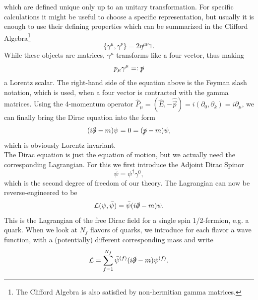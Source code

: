 which are defined unique only up to an unitary transformation. For specific calculations it might be useful to choose a specific representation, but usually it is enough to use their defining properties which can be summarized in the Clifford Algebra\footnote{The Clifford Algebra is also satisfied by non-hermitian gamma matrices.}
\begin{equation}
    \lbrace \gamma^\mu,\gamma^\nu\rbrace=2\eta^{\mu\nu}\mathbb{1}.
\end{equation}
While these objects are matrices, $\gamma^\mu$ transforms like a four vector, thus making
\begin{equation}
    p_\mu\gamma^\mu =:\slashed p
\end{equation}
a Lorentz scalar. The right-hand side of the equation above is the Feyman slash notation, which is used, when a four vector is contracted with the gamma matrices.
Using the 4-momentum operator $\hat P_\mu=(\hat E, -\hat {\vec p})=i(\partial_0, \partial_k)=i\partial_\mu$, we can finally bring the Dirac equation into the form
\begin{equation}
    (i\slashed \partial-m)\psi = 0 = (\slashed p -m)\psi,
\end{equation}
which is obviously Lorentz invariant.\\
The Dirac equation is just the equation of motion, but we actually need the corresponding Lagrangian. For this we first introduce the Adjoint Dirac Spinor 
\begin{equation}
    \bar\psi=\psi^\dagger \gamma^0,
\end{equation}
which is the second degree of freedom of our theory. The Lagrangian can now be reverse-engineered to be
\begin{equation}
    \mathcal L(\psi, \bar \psi) = \bar\psi(i\slashed \partial-m)\psi.\label{eq:freeDirac}
\end{equation}
This is the Lagrangian of the free Dirac field for a single spin 1/2-fermion, e.g. a quark. When we look at $N_f$ flavors of quarks, we introduce for each flavor a wave function, with a (potentially) different corresponding mass and write
\begin{equation}
    \mathcal L = \sum_{f=1}^{N_f}\bar\psi^{(f)}(i\slashed \partial-m)\psi^{(f)}.
\end{equation}











